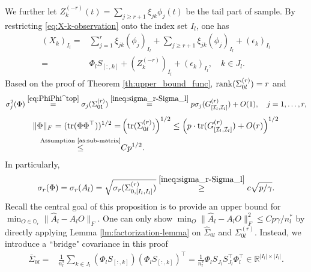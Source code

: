 \documentclass[11pt]{article}
\newcommand{\0}{{\mathbf{0}}}
\newcommand{\1}{{\mathbf{1}}}
\newcommand{\rank}{{\rm rank}}
\newcommand{\tr}{{\rm tr}}
\begin{document}
\begin{enumerate}[leftmargin=*]
\begin{equation}
	\end{equation} 
	We further let $Z^{(-r)}_k(t) = \sum_{j \geq r+1} \xi_{jk}\phi_j(t) $ be the tail part of sample. By restricting \eqref{eq:X-k-observation} onto the index set $I_l$, one has
	\begin{equation*}
	\begin{split}
	(X_k)_{I_l} = & \sum_{j=1}^r \xi_{jk}(\phi_{j})_{I_l}  + \sum_{j \geq r+1} \xi_{jk}(\phi_j)_{I_l}  + (\epsilon_{k})_{I_l}\\
	= & \Phi_l S_{[:, k]} + (Z_{k}^{(-r)})_{I_l} + (\epsilon_k)_{I_l}, \quad k\in J_l.
	\end{split}
	\end{equation*}
	Based on the proof of Theorem \ref{th:upper_bound_func}, $\rank(\Sigma_{0l}^{(r)}) = r$ and 
	$$\sigma_j^2(\Phi) \overset{\eqref{eq:PhiPhi^top}}{=} \sigma_j(\Sigma^{(r)}_{01}) \overset{\eqref{ineq:sigma_r-Sigma_l}}{=} p\sigma_j(G^{(r)}_{[\mathcal{I}_l, \mathcal{I}_l]}) + O(1), \quad j=1,\ldots, r,$$
	\begin{equation}\label{ineq:Phi-F}
	\begin{split}
	\|\Phi\|_F = (\tr(\Phi\Phi^\top))^{1/2} = & \left(\tr(\Sigma_{0l}^{(r)})\right)^{1/2}\leq \left(p\cdot \tr(G^{(r)}_{[\mathcal{I}_l, \mathcal{I}_l]}) + O(r)\right)^{1/2} \\
	\overset{\text{Assumption \ref{as:sub-matrix}}}{\leq} &  Cp^{1/2}.
	\end{split}
	\end{equation}
	In particularly,
	\begin{equation}\label{eq:sigma_r-Phi}
	\sigma_r(\Phi) = \sigma_r(A_l) = \sqrt{\sigma_r(\Sigma_{0, [I_l, I_l]}^{(r)})} \overset{\eqref{ineq:sigma_r-Sigma_l}}{\geq} c\sqrt{p/\gamma}.
	\end{equation}
	Recall the central goal of this proposition is to provide an upper bound for $\min_{O\in \mathbb{O}_r}\|\hat{A}_l - A_lO\|_F$. One can only show $\min_O \|\hat{A}_l - A_lO\|_F^2 \leq Cp\gamma/n_l^\ast$ by directly applying Lemma \ref{lm:factorization-lemma} on $\hat{\Sigma}_{0l}$ and $\Sigma_{0l}^{(r)}$. Instead, we introduce a ``bridge" covariance in this proof
	\begin{equation}
	\begin{split}
	\bar{\Sigma}_{0l} = & \frac{1}{n_l^\ast} \sum_{k\in J_l}(\Phi_l S_{[:, k]})(\Phi_l S_{[:, k]})^\top  = \frac{1}{n_l^\ast} \Phi_l S_{J_l} S_{J_l}^\top \Phi_l^\top \in \mathbb{R}^{|I_l|\times |I_l|}. 
	\end{split}
	\end{equation}

\end{enumerate}
\end{document}
